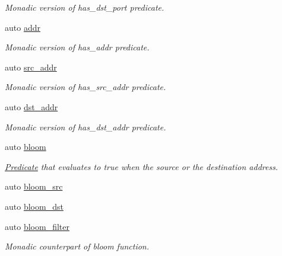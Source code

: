 \begin{DoxyCompactItemize}
\begin{DoxyCompactList}\small\item\em Monadic version of {\ttfamily has\+\_\+dst\+\_\+port} predicate. \end{DoxyCompactList}\item 
auto \hyperlink{namespacepfq_1_1lang_1_1anonymous__namespace_02default_8hpp_03_a13cabe468839119d8d68540e3c60718b}{addr}
\begin{DoxyCompactList}\small\item\em Monadic version of {\ttfamily has\+\_\+addr} predicate. \end{DoxyCompactList}\item 
auto \hyperlink{namespacepfq_1_1lang_1_1anonymous__namespace_02default_8hpp_03_a2ee09b5a65a64d60bc797b2ecd1c8a4a}{src\+\_\+addr}
\begin{DoxyCompactList}\small\item\em Monadic version of {\ttfamily has\+\_\+src\+\_\+addr} predicate. \end{DoxyCompactList}\item 
auto \hyperlink{namespacepfq_1_1lang_1_1anonymous__namespace_02default_8hpp_03_a3f51de44baa33ff19a94995945636072}{dst\+\_\+addr}
\begin{DoxyCompactList}\small\item\em Monadic version of {\ttfamily has\+\_\+dst\+\_\+addr} predicate. \end{DoxyCompactList}\item 
auto \hyperlink{namespacepfq_1_1lang_1_1anonymous__namespace_02default_8hpp_03_abfcd230137acb93cfd99f7a0a7c1f17f}{bloom}
\begin{DoxyCompactList}\small\item\em \hyperlink{structpfq_1_1lang_1_1Predicate}{Predicate} that evaluates to {\ttfamily true} when the source or the destination address. \end{DoxyCompactList}\item 
auto \hyperlink{namespacepfq_1_1lang_1_1anonymous__namespace_02default_8hpp_03_aa2a8ff506d61e93d8eca4419513970f4}{bloom\+\_\+src}
\item 
auto \hyperlink{namespacepfq_1_1lang_1_1anonymous__namespace_02default_8hpp_03_ac1c667000a13acfbda8490d5748b91c4}{bloom\+\_\+dst}
\item 
auto \hyperlink{namespacepfq_1_1lang_1_1anonymous__namespace_02default_8hpp_03_a3a5eda5d7a49e279941725df8388378d}{bloom\+\_\+filter}
\begin{DoxyCompactList}\small\item\em Monadic counterpart of {\ttfamily bloom} function. \end{DoxyCompactList}\item 

\end{DoxyCompactItemize}
